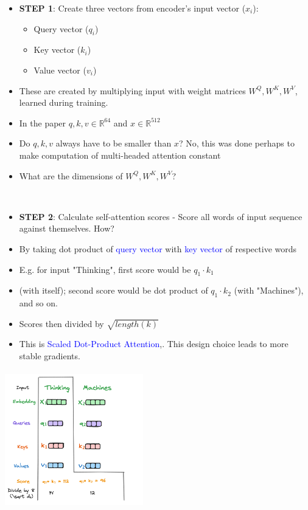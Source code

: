 \documentclass{article}
\begin{document}
\begin{minipage}{0.5\textwidth}
\begin{itemize}
    \item \textbf{STEP 1}: Create three vectors from encoder's input vector ($x_i$):
    \begin{itemize}
        \item Query vector ($q_i$)
        \item Key vector ($k_i$)
        \item Value vector ($v_i$)
    \end{itemize}
    \item These are created by multiplying input with weight matrices $W^Q, W^K, W^V$, learned during training.
    \item In the paper $q,k,v \in \mathbb{R}^{64} $ and $x \in \mathbb{R}^{512}$
    \item Do $q,k,v$ always have to be smaller than $x$? No, this was done perhaps to make computation of multi-headed attention constant
    \item What are the dimensions of $W^Q, W^K, W^V$?
\end{itemize}
\end{minipage}
\\
\begin{minipage}{0.5\textwidth}

\begin{itemize}
    \item \textbf{STEP 2}: Calculate self-attention scores - Score all words of input sequence against themselves. How?
    \item By taking dot product of \textcolor{blue}{query vector} with \textcolor{blue}{key vector} of respective words
    \item E.g. for input "Thinking", first score would be $q_1 \cdot k_1 $
    \item  (with itself); second score would be dot product of $q_1 \cdot k_2$ (with "Machines"), and so on.
    \item Scores then divided by $\sqrt{length(k)}$
    \item This is \textcolor{blue}{Scaled Dot-Product Attention},. This design choice leads to more stable gradients.
\end{itemize}
\end{minipage}
\begin{minipage}{0.5\textwidth}
\includegraphics[width=6cm, height=6cm]{Transformer/Images/SelfAttention2.png}
\end{minipage}
\end{document}
